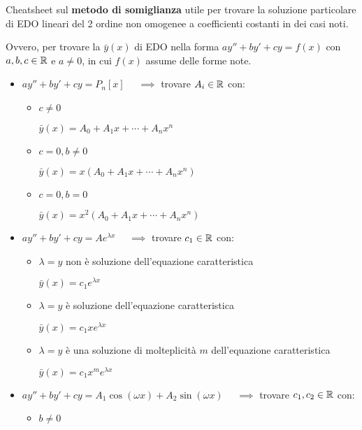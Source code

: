 Cheatsheet sul \textbf{metodo di somiglianza} utile per trovare la soluzione particolare di EDO lineari del 2 ordine non omogenee a coefficienti costanti in dei casi noti.

Ovvero, per trovare la \(\bar{y}(x)\) di EDO nella forma \(ay''+by'+cy=f(x)\) con \(a,b,c \in \mathbb{R} \) e \(a \ne 0\), in cui \(f(x)\) assume delle forme note.

\begin{itemize}
    \item \(ay''+by'+cy = P_n[x]\)
          \(\quad \implies \) trovare \(A_{i} \in \mathbb{R} \) con:
          \begin{itemize}
              \item \(c \ne 0\)

                    \smallskip
                    \(\bar{y}(x) = A_0 + A_{1}x + \cdots + A_{n}x^{n}\)
                    \medskip
              \item \(c = 0, b \ne 0\)

                    \smallskip
                    \(\bar{y}(x) = x (A_0 + A_{1}x + \cdots + A_{n}x^{n})\)
                    \medskip
              \item \(c = 0, b = 0\)

                    \smallskip
                    \(\bar{y}(x) = x^{2} (A_0 + A_{1}x + \cdots + A_{n}x^{n})\)
                    \medskip
          \end{itemize}
    \item \(ay''+by'+cy = Ae^{\lambda x}\)
          \(\quad \implies \) trovare \(c_{1} \in \mathbb{R} \) con:
          \begin{itemize}
              \item \(\lambda = y\) non è soluzione dell'equazione caratteristica

                    \smallskip
                    \(\bar{y}(x) = c_{1}e^{\lambda x}\)
                    \medskip
              \item \(\lambda = y\) è soluzione dell'equazione caratteristica

                    \smallskip
                    \(\bar{y}(x) = c_{1}xe^{\lambda x}\)
                    \medskip
              \item \(\lambda = y\) è una soluzione di molteplicità \(m\) dell'equazione caratteristica

                    \smallskip
                    \(\bar{y}(x) = c_{1}x^{m}e^{\lambda x}\)
                    \medskip
          \end{itemize}
    \item \(ay''+by'+cy = A_{1}\cos(\omega x) + A_{2}\sin(\omega x)\)
          \(\quad \implies \) trovare \(c_1,c_2 \in \mathbb{R} \) con:
          \begin{itemize}
              \item \(b \ne 0\)


\end{itemize}
\end{itemize}

